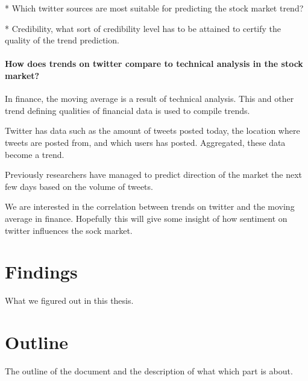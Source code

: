 * Which twitter sources are most suitable for predicting the stock market
trend?

* Credibility, what sort of credibility level has to be attained to certify the
quality of the trend prediction. 

	\paragraph{How does trends on twitter compare to technical analysis in the
stock market?\\}

In finance, the moving average is a result of technical analysis. This and
other trend defining qualities of financial data is used to compile trends. 

Twitter has data such as the amount of tweets posted today, the location where
tweets are posted from, and which users has posted. Aggregated, these data
become a trend. 

Previously researchers have managed to predict direction of the market the
next few days based on the volume of tweets. 

We are interested in the correlation between trends on twitter and the moving
average in finance. Hopefully this will give some insight of how sentiment on
twitter influences the sock market.  

\section{Findings}
What we figured out in this thesis. 

\section{Outline}
The outline of the document and the description of what which part is about. 


